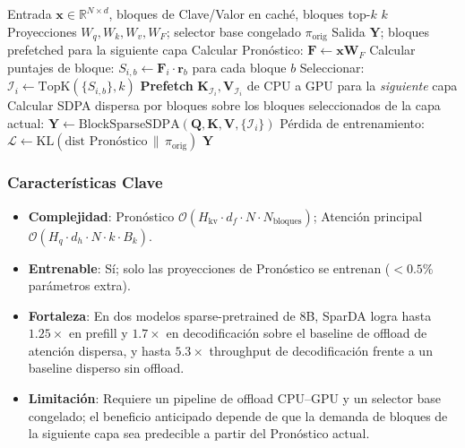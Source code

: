 \begin{algorithm}[H]
\caption{SparDA: Atención Dispersa Desacoplada con Prefetch de Pronóstico}
\begin{algorithmic}[1]
\Require Entrada $\mathbf{x} \in \mathbb{R}^{N \times d}$, bloques de Clave/Valor en caché, bloques top-$k$ $k$
\Require Proyecciones $W_q, W_k, W_v, W_F$; selector base congelado $\pi_{\text{orig}}$
\Ensure Salida $\mathbf{Y}$; bloques prefetched para la siguiente capa
\State Calcular Pronóstico: $\mathbf{F} \gets \mathbf{x} \mathbf{W}_F$ 
    \State Calcular puntajes de bloque: $S_{i,b} \gets \mathbf{F}_i \cdot \mathbf{r}_b$ para cada bloque $b$
    \State Seleccionar: $\mathcal{I}_i \gets \mathrm{TopK}(\{S_{i,b}\}, k)$
    \State \textbf{Prefetch} $\mathbf{K}_{\mathcal{I}_i}, \mathbf{V}_{\mathcal{I}_i}$ de CPU a GPU para la \emph{siguiente} capa 
\EndFor
\State Calcular SDPA dispersa por bloques sobre los bloques seleccionados de la capa actual: $\mathbf{Y} \gets \mathrm{BlockSparseSDPA}(\mathbf{Q}, \mathbf{K}, \mathbf{V}, \{\mathcal{I}_i\})$
\State Pérdida de entrenamiento: $\mathcal{L} \gets \mathrm{KL}(\text{dist Pronóstico} \,\|\, \pi_{\text{orig}})$ 
\Return $\mathbf{Y}$
\end{algorithmic}
\end{algorithm}

\subsubsection{Características Clave}

\begin{itemize}[leftmargin=*]
    \item \textbf{Complejidad}: Pronóstico $\mathcal{O}(H_{\text{kv}} \cdot d_f \cdot N \cdot N_{\text{bloques}})$; Atención principal $\mathcal{O}(H_q \cdot d_h \cdot N \cdot k \cdot B_k)$.
    \item \textbf{Entrenable}: Sí; solo las proyecciones de Pronóstico se entrenan ($<0.5\%$ parámetros extra).
    \item \textbf{Fortaleza}: En dos modelos sparse-pretrained de 8B, SparDA logra hasta $1.25\times$ en prefill y $1.7\times$ en decodificación sobre el baseline de offload de atención dispersa, y hasta $5.3\times$ throughput de decodificación frente a un baseline disperso sin offload.
    \item \textbf{Limitación}: Requiere un pipeline de offload CPU--GPU y un selector base congelado; el beneficio anticipado depende de que la demanda de bloques de la siguiente capa sea predecible a partir del Pronóstico actual.
\end{itemize}

